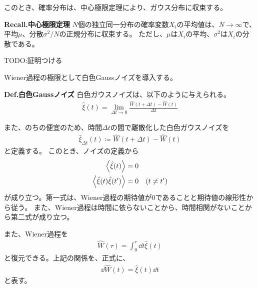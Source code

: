 \documentclass[a4paper,11pt]{jsarticle}
\numberwithin{equation}{section}
\begin{document}
このとき、確率分布は、中心極限定理により、ガウス分布に収束する。
\begin{itembox}[l]{\textbf{Recall.中心極限定理}}
    $N$個の独立同一分布の確率変数$X_i$の平均値は、$N \to \infty$で、平均$\mu$、分散$\sigma^2/N$の正規分布に収束する。
    ただし、$\mu$は$X_i$の平均、$\sigma^2$は$X_i$の分散である。

\end{itembox}
TODO:証明つける

Wiener過程の極限として白色Gaussノイズを導入する。
\begin{itembox}[l]{\textbf{Def.白色Gaussノイズ}}
    白色ガウスノイズは、以下のように与えられる。
    \begin{align}
        \hat{\xi}(t) = \lim_{\Delta t \to 0} \frac{\hat{W}(t+\Delta t) - \hat{W}(t)}{\Delta t}
    \end{align}
\end{itembox}
また、のちの便宜のため、時間$\Delta t$の間で離散化した白色ガウスノイズを
\begin{align}
    \hat{\xi}_{\Delta t}(t) \coloneq \hat{W}(t+\Delta t) - \hat{W}(t)
\end{align}
と定義する。
このとき、ノイズの定義から
\begin{align}
    \ev{\hat{\xi}(t)} &= 0 \label{eq:xi_mean} \\
    \ev{\hat{\xi}(t) \hat{\xi}(t')} &= 0 \quad (t \neq t') \label{eq:xi_correlation} \\
\end{align}
が成り立つ。第一式は、Wiener過程の期待値が0であることと期待値の線形性から従う。
また、Wiener過程は時間に依らないことから、時間相関がないことから第二式が成り立つ。

また、Wiener過程を
\begin{align}
    \hat{W}(\tau) = \int_0^{\tau} \dd{t} \hat{\xi}(t)
\end{align}
と復元できる。上記の関係を、正式に、
\begin{align}
    \dd{\hat{W}(t)} = \hat{\xi}(t) \dd{t}
\end{align}
と表す。
\end{document}
